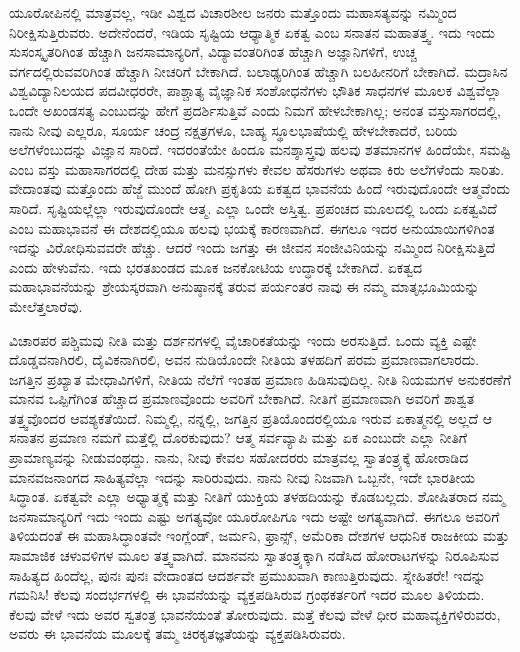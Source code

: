 ಯೂರೋಪಿನಲ್ಲಿ ಮಾತ್ರವಲ್ಲ, ಇಡೀ ವಿಶ್ವದ ವಿಚಾರಶೀಲ ಜನರು ಮತ್ತೊಂದು ಮಹಾಸತ್ಯವನ್ನು ನಮ್ಮಿಂದ ನಿರೀಕ್ಷಿಸುತ್ತಿರುವರು. ಅದೇನೆಂದರೆ, ಇಡಿಯ ಸೃಷ್ಟಿಯ ಆಧ್ಯಾತ್ಮಿಕ ಏಕತ್ವ ಎಂಬ ಸನಾತನ ಮಹಾತತ್ತ್ವ. ಇದು ಇಂದು ಸುಸಂಸ್ಕೃತರಿಗಿಂತ ಹೆಚ್ಚಾಗಿ ಜನಸಾಮಾನ್ಯರಿಗೆ, ವಿದ್ಯಾವಂತರಿಗಿಂತ ಹೆಚ್ಚಾಗಿ ಅಜ್ಞಾನಿಗಳಿಗೆ, ಉಚ್ಚ ವರ್ಗದಲ್ಲಿರುವವರಿಗಿಂತ ಹೆಚ್ಚಾಗಿ ನೀಚರಿಗೆ ಬೇಕಾಗಿದೆ. ಬಲಾಢ್ಯರಿಗಿಂತ ಹೆಚ್ಚಾಗಿ ಬಲಹೀನರಿಗೆ ಬೇಕಾಗಿದೆ. ಮದ್ರಾಸಿನ ವಿಶ್ವವಿದ್ಯಾನಿಲಯದ ಪದವೀಧರರೇ, ಪಾಶ್ಚಾತ್ಯ ವೈಜ್ಞಾನಿಕ ಸಂಶೋಧನೆಗಳು ಭೌತಿಕ ಸಾಧನಗಳ ಮೂಲಕ ವಿಶ್ವವೆಲ್ಲಾ ಒಂದೇ ಅಖಂಡಸತ್ಯ ಎಂಬುದನ್ನು ಹೇಗೆ ಪ್ರದರ್ಶಿಸುತ್ತಿವೆ ಎಂದು ನಿಮಗೆ ಹೇಳಬೇಕಾಗಿಲ್ಲ; ಅನಂತ ವಸ್ತುಸಾಗರದಲ್ಲಿ, ನಾನು ನೀವು ಎಲ್ಲರೂ, ಸೂರ್ಯ ಚಂದ್ರ ನಕ್ಷತ್ರಗಳೂ, ಬಾಹ್ಯ ಸ್ಥೂಲಭಾಷೆಯಲ್ಲಿ ಹೇಳಬೇಕಾದರೆ, ಬರಿಯ ಅಲೆಗಳೆಂಬುದನ್ನು ವಿಜ್ಞಾನ ಸಾರಿದೆ. ಇದರಂತೆಯೇ ಹಿಂದೂ ಮನಶ್ಶಾಸ್ತ್ರವು ಹಲವು ಶತಮಾನಗಳ ಹಿಂದೆಯೇ, ಸಮಷ್ಟಿ ಎಂಬ ವಸ್ತು ಮಹಾಸಾಗರದಲ್ಲಿ ದೇಹ ಮತ್ತು ಮನಸ್ಸುಗಳು ಕೇವಲ ಹೆಸರುಗಳು ಅಥವಾ ಕಿರು ಅಲೆಗಳೆಂದು ಸಾರಿತು. ವೇದಾಂತವು ಮತ್ತೊಂದು ಹೆಜ್ಜೆ ಮುಂದೆ ಹೋಗಿ ಪ್ರಕೃತಿಯ ಏಕತ್ವದ ಭಾವನೆಯ ಹಿಂದೆ ಇರುವುದೊಂದೇ ಆತ್ಮವೆಂದು ಸಾರಿದೆ. ಸೃಷ್ಟಿಯಲ್ಲೆಲ್ಲಾ ಇರುವುದೊಂದೇ ಆತ್ಮ. ಎಲ್ಲಾ ಒಂದೇ ಅಸ್ತಿತ್ವ. ಪ್ರಪಂಚದ ಮೂಲದಲ್ಲಿ ಒಂದು ಏಕತ್ವವಿದೆ ಎಂಬ ಮಹಾಭಾವನೆ ಈ ದೇಶದಲ್ಲಿಯೂ ಹಲವು ಭಯಕ್ಕೆ ಕಾರಣವಾಗಿದೆ. ಈಗಲೂ ಇದರ ಅನುಯಾಯಿಗಳಿಗಿಂತ ಇದನ್ನು ವಿರೋಧಿಸುವವರೇ ಹೆಚ್ಚು. ಆದರೆ ಇಂದು ಜಗತ್ತು ಈ ಜೀವನ ಸಂಜೀವಿನಿಯನ್ನು ನಮ್ಮಿಂದ ನಿರೀಕ್ಷಿಸುತ್ತಿದೆ ಎಂದು ಹೇಳುವೆನು. ಇದು ಭರತಖಂಡದ ಮೂಕ ಜನಕೋಟಿಯ ಉದ್ಧಾರಕ್ಕೆ ಬೇಕಾಗಿದೆ. ಏಕತ್ವದ ಮಹಾಭಾವನೆಯನ್ನು ಶ್ರೇಯಸ್ಕರವಾಗಿ ಅನುಷ್ಠಾನಕ್ಕೆ ತರುವ ಪರ್ಯಂತರ ನಾವು ಈ ನಮ್ಮ ಮಾತೃಭೂಮಿಯನ್ನು ಮೇಲೆತ್ತಲಾರೆವು.

ವಿಚಾರಪರ ಪಶ್ಚಿಮವು ನೀತಿ ಮತ್ತು ದರ್ಶನಗಳಲ್ಲಿ ವೈಚಾರಿಕತೆಯನ್ನು ಇಂದು ಅರಸುತ್ತಿದೆ. ಒಂದು ವ್ಯಕ್ತಿ ಎಷ್ಟೇ ದೊಡ್ಡವನಾಗಿರಲಿ, ದೈವಿಕನಾಗಿರಲಿ, ಅವನ ನುಡಿಯೊಂದೇ ನೀತಿಯ ತಳಹದಿಗೆ ಪರಮ ಪ್ರಮಾಣವಾಗಲಾರದು. ಜಗತ್ತಿನ ಪ್ರಖ್ಯಾತ ಮೇಧಾವಿಗಳಿಗೆ, ನೀತಿಯ ನೆಲೆಗೆ ಇಂತಹ ಪ್ರಮಾಣ ಹಿಡಿಸುವುದಿಲ್ಲ. ನೀತಿ ನಿಯಮಗಳ ಅನುಕರಣೆಗೆ ಮಾನವ ಒಪ್ಪಿಗೆಗಿಂತ ಹೆಚ್ಚಾದ ಪ್ರಮಾಣವೊಂದು ಅವರಿಗೆ ಬೇಕಾಗಿದೆ. ನೀತಿಗೆ ಪ್ರಮಾಣವಾಗಿ ಅವರಿಗೆ ಶಾಶ್ವತ ತತ್ತ್ವವೊಂದರ ಆವಶ್ಯಕತೆಯಿದೆ. ನಿಮ್ಮಲ್ಲಿ, ನನ್ನಲ್ಲಿ, ಜಗತ್ತಿನ ಪ್ರತಿಯೊಂದರಲ್ಲಿಯೂ ಇರುವ ಏಕಾತ್ಮನಲ್ಲಿ ಅಲ್ಲದೆ ಆ ಸನಾತನ ಪ್ರಮಾಣ ನಮಗೆ ಮತ್ತೆಲ್ಲಿ ದೊರಕುವುದು? ಆತ್ಮ ಸರ್ವವ್ಯಾಪಿ ಮತ್ತು ಏಕ ಎಂಬುದೇ ಎಲ್ಲಾ ನೀತಿಗೆ ಪ್ರಾಮಾಣ್ಯವನ್ನು ನೀಡುವಂಥದ್ದು. ನಾನು, ನೀವು ಕೇವಲ ಸಹೋದರರು ಮಾತ್ರವಲ್ಲ ಸ್ವಾತಂತ್ರ್ಯಕ್ಕೆ ಹೋರಾಡಿದ ಮಾನವಜನಾಂಗದ ಸಾಹಿತ್ಯವೆಲ್ಲಾ ಇದನ್ನು ಸಾರಿರುವುದು. ನಾನು ನೀವು ನಿಜವಾಗಿ ಒಬ್ಬನೇ, ಇದೇ ಭಾರತೀಯ ಸಿದ್ಧಾಂತ. ಏಕತ್ವವೇ ಎಲ್ಲಾ ಅಧ್ಯಾತ್ಮಕ್ಕೆ ಮತ್ತು ನೀತಿಗೆ ಯುಕ್ತಿಯ ತಳಹದಿಯನ್ನು ಕೊಡಬಲ್ಲದು. ಶೋಷಿತರಾದ ನಮ್ಮ ಜನಸಾಮಾನ್ಯರಿಗೆ ಇದು ಇಂದು ಎಷ್ಟು ಅಗತ್ಯವೋ ಯೂರೋಪಿಗೂ ಇದು ಅಷ್ಟೇ ಅಗತ್ಯವಾಗಿದೆ. ಈಗಲೂ ಅವರಿಗೆ ತಿಳಿಯದಂತೆ ಈ ಮಹಾಸಿದ್ಧಾಂತವೇ ಇಂಗ್ಲೆಂಡ್​, ಜರ್ಮನಿ, ಫ್ರಾನ್ಸ್, ಅಮೆರಿಕಾ ದೇಶಗಳ ಆಧುನಿಕ ರಾಜಕೀಯ ಮತ್ತು ಸಾಮಾಜಿಕ ಚಳುವಳಿಗಳ ಮೂಲ ತತ್ತ್ವವಾಗಿದೆ. ಮಾನವನು ಸ್ವಾತಂತ್ರ್ಯಕ್ಕಾಗಿ ನಡೆಸಿದ ಹೋರಾಟಗಳನ್ನು ನಿರೂಪಿಸುವ ಸಾಹಿತ್ಯದ ಹಿಂದೆಲ್ಲ, ಪುನಃ ಪುನಃ ವೇದಾಂತದ ಆದರ್ಶವೇ ಪ್ರಮುಖವಾಗಿ ಕಾಣುತ್ತಿರುವುದು. ಸ್ನೇಹಿತರೇ! ಇದನ್ನು ಗಮನಿಸಿ! ಕೆಲವು ಸಂದರ್ಭಗಳಲ್ಲಿ ಈ ಭಾವನೆಯನ್ನು ವ್ಯಕ್ತಪಡಿಸಿರುವ ಗ್ರಂಥಕರ್ತರಿಗೆ ಇದರ ಮೂಲ ತಿಳಿಯದು. ಕೆಲವು ವೇಳೆ ಇದು ಅವರ ಸ್ವತಂತ್ರ ಭಾವನೆಯಂತೆ ತೋರುವುದು. ಮತ್ತೆ ಕೆಲವು ವೇಳೆ ಧೀರ ಮಹಾವ್ಯಕ್ತಿಗಳಿರುವರು, ಅವರು ಈ ಭಾವನೆಯ ಮೂಲಕ್ಕೆ ತಮ್ಮ ಚಿರಕೃತಜ್ಞತೆಯನ್ನು ವ್ಯಕ್ತಪಡಿಸಿರುವರು.

